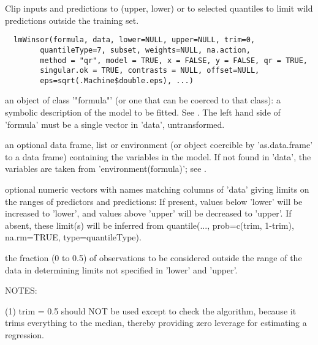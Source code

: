 \begin{Description}\relax
Clip inputs and predictions to (upper, lower) or to selected quantiles
to limit wild predictions outside the training set.
\end{Description}
\begin{Usage}
\begin{verbatim}
  lmWinsor(formula, data, lower=NULL, upper=NULL, trim=0,
        quantileType=7, subset, weights=NULL, na.action,
        method = "qr", model = TRUE, x = FALSE, y = FALSE, qr = TRUE,
        singular.ok = TRUE, contrasts = NULL, offset=NULL,
        eps=sqrt(.Machine$double.eps), ...)
\end{verbatim}
\end{Usage}
\begin{Arguments}
\begin{ldescription}
\item[\code{formula}] an object of class '"formula"' (or one that can be coerced to that
class): a symbolic description of the model to be fitted.  See
.  The left hand side of 'formula' must be a single vector
in 'data', untransformed.  

\item[\code{data}] an optional data frame, list or environment (or object coercible by
'as.data.frame' to a data frame) containing the variables in the
model.  If not found in 'data', the variables are taken from
'environment(formula)';  see . 

\item[\code{lower, upper}] optional numeric vectors with names matching columns of 'data'
giving limits on the ranges of predictors and predictions:  If
present, values below 'lower' will be increased to 'lower', and
values above 'upper' will be decreased to 'upper'.  If absent, these
limit(s) will be inferred from quantile(..., prob=c(trim, 1-trim),
na.rm=TRUE, type=quantileType).  

\item[\code{trim}] the fraction (0 to 0.5) of observations to be considered outside the
range of the data in determining limits not specified in 'lower' and
'upper'.  

NOTES:

(1) trim = 0.5 should NOT be used except to check  the algorithm,
because it trims everything to the median, thereby providing zero
leverage for estimating a regression.


\end{ldescription}
\end{Arguments}
